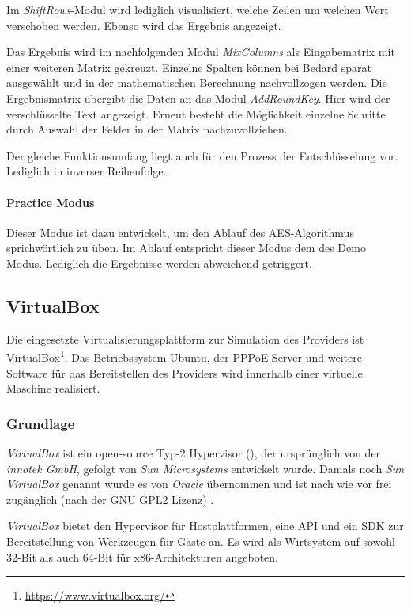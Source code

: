    Im \textit{ShiftRows}-Modul wird lediglich visualisiert, welche Zeilen um welchen Wert verschoben
   werden. Ebenso wird das Ergebnis angezeigt.

   Das Ergebnis wird im nachfolgenden Modul \textit{MixColumns} als Eingabematrix mit einer weiteren
   Matrix gekreuzt. Einzelne Spalten können bei Bedard sparat ausgewählt und in der
   mathematischen Berechnung nachvollzogen werden. Die Ergebnismatrix übergibt die Daten
   an das Modul \textit{AddRoundKey}.
   Hier wird der verschlüsselte Text angezeigt. Erneut besteht die Möglichkeit einzelne Schritte
   durch Auswahl der Felder in der Matrix nachzuvollziehen.

   Der gleiche Funktionsumfang liegt auch für den Prozess der Entschlüsselung vor. Lediglich in
   inverser Reihenfolge\cite{michiganuni}.

   \paragraph{Practice Modus}
   Dieser Modus ist dazu entwickelt, um den Ablauf des AES-Algorithmus sprichwörtlich zu üben.
   Im Ablauf entspricht dieser Modus dem des Demo Modus. Lediglich die Ergebnisse werden
   abweichend getriggert.

\subsection{VirtualBox}
Die eingesetzte Virtualisierungsplattform zur Simulation des Providers ist VirtualBox\footnote{\url{https://www.virtualbox.org/}}. Das Betriebssystem Ubuntu, der PPPoE-Server und weitere Software für
das Bereitstellen des Providers wird innerhalb einer virtuelle Maschine realisiert.

\subsubsection{Grundlage}
\textit{VirtualBox} ist ein open-source Typ-2 Hypervisor (), der
ursprünglich von der \textit{innotek GmbH}, gefolgt von \textit{Sun Microsystems} entwickelt wurde.
Damals noch \textit{Sun VirtualBox} genannt wurde es von \textit{Oracle} übernommen und ist
nach wie vor frei zugänglich (nach der GNU GPL2 Lizenz) \cite{dash13}.

\textit{VirtualBox} bietet den Hypervisor für Hostplattformen, eine API und ein SDK zur
Bereitstellung von Werkzeugen für Gäste an. Es wird als Wirtsystem auf sowohl 32-Bit als auch
64-Bit für x86-Architekturen angeboten.

